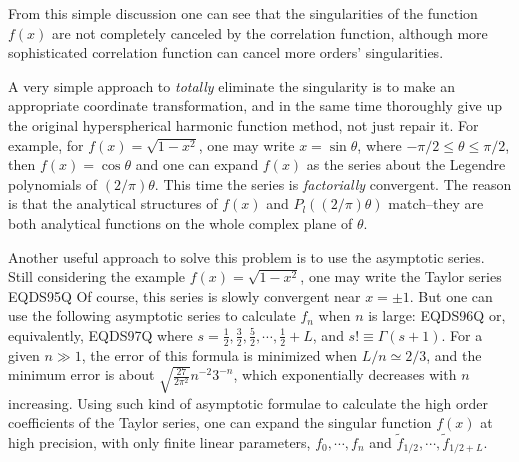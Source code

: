 From this simple discussion one can see that the singularities of the function
$f(x)$ are not completely canceled by the correlation function, although more
sophisticated correlation function can cancel more orders' singularities.

A very simple approach to \emph{totally} eliminate the singularity is
to make an appropriate coordinate transformation,
and in the same time thoroughly give up the original hyperspherical
harmonic function method, not just repair it.
For example, for $f(x)=\sqrt{1-x^2}$, one may write $x=\sin{\theta}$, where
$-\pi/2\le\theta\le\pi/2$, then $f(x)=\cos{\theta}$ and one can expand $f(x)$
as the series about the Legendre polynomials of $(2/\pi)\theta$.
This time the series is \emph{factorially} convergent. The reason is that
the analytical structures of $f(x)$ and $P_l((2/\pi)\theta)$ match--they are
both analytical functions on the whole complex plane of $\theta$.

Another useful approach to solve this problem is to use the asymptotic series.
Still considering the example $f(x)=\sqrt{1-x^2}$, one may write the Taylor
series
 EQDS95Q 
Of course, this series is slowly convergent near $x=\pm 1$. But one can use the
following asymptotic series to calculate $f_n$ when $n$ is large:
 EQDS96Q 
or, equivalently,
 EQDS97Q 
where $s=\frac{1}{2}, \frac{3}{2}, \frac{5}{2}, \cdots, \frac{1}{2}+L$,
and $s!\equiv\Gamma(s+1)$. For a given $n \gg 1$, the error of
this formula is minimized
when $L/n \simeq 2/3$, and the minimum error is about 
$\sqrt{\frac{27}{2\pi^2}} n^{-2} 3^{-n}$, which exponentially decreases with $n$
increasing. Using such kind of asymptotic formulae to calculate the high order
coefficients of the Taylor series, one can expand the singular function $f(x)$
at high precision, with only finite linear parameters, $f_0, \cdots, f_n$ and
$\tilde{f}_{1/2}, \cdots, \tilde{f}_{1/2+L}$.

